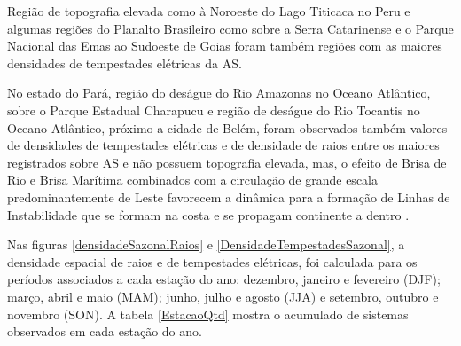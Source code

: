 Região de topografia elevada como à Noroeste do Lago Titicaca no Peru e algumas regiões do Planalto Brasileiro como sobre a Serra Catarinense e o Parque Nacional das Emas ao Sudoeste de Goias foram também regiões com as maiores densidades de tempestades elétricas da AS.

No estado do Pará, região do deságue do Rio Amazonas no Oceano Atlântico, sobre o Parque Estadual Charapucu e região de deságue do Rio Tocantis no Oceano Atlântico, próximo a cidade de Belém, foram observados também valores de densidades de tempestades elétricas e de densidade de raios entre os maiores registrados sobre AS e não possuem topografia elevada, mas, o efeito de Brisa de Rio e Brisa Marítima combinados com a circulação de grande escala predominantemente de Leste favorecem a dinâmica para a formação de  Linhas de Instabilidade que se formam na costa e se propagam continente a dentro  \cite{kousky1980,cohen1995Li,Clenia2010}.


Nas figuras \ref{densidadeSazonalRaios} e \ref{DensidadeTempestadesSazonal}, a densidade espacial de raios e de tempestades elétricas, foi calculada para os períodos associados a cada estação do ano: dezembro, janeiro e fevereiro (DJF); março, abril e maio (MAM); junho, julho e agosto (JJA) e setembro, outubro e novembro (SON). A tabela \ref{EstacaoQtd} mostra o acumulado de sistemas observados em cada estação do ano.




\begin{sidewaysfigure}
  \caption{Densidade sazonal de raios. As cores representam o número de raios por ano por quilômetro quadrado ([ano$^{-1}$] [km$^{-2}$]) em cada ponto da grade de 0,25$^{\circ}$ $\times$ 0,25$^{\circ}$. } 
\label{densidadeSazonalRaios}
\end{sidewaysfigure}

